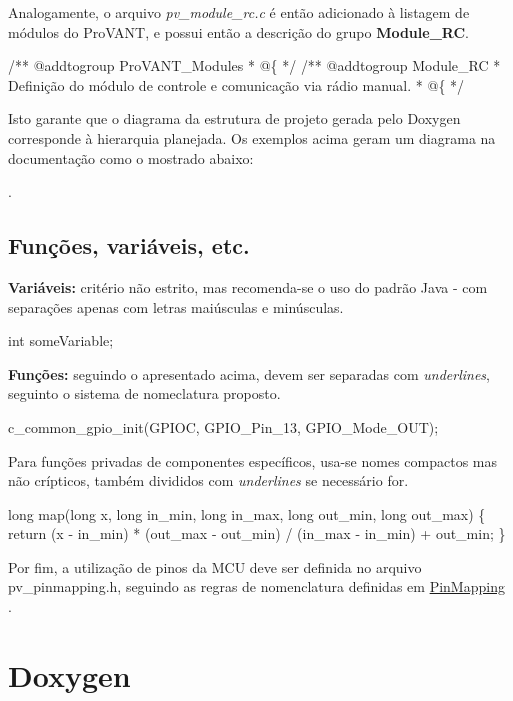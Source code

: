 Analogamente, o arquivo {\itshape pv\-\_\-module\-\_\-rc.\-c} é então adicionado à listagem de módulos do Pro\-V\-A\-N\-T, e possui então a descrição do grupo {\bfseries Module\-\_\-\-R\-C}.


\begin{DoxyCode}
\textcolor{comment}{/** @addtogroup ProVANT\_Modules}
\textcolor{comment}{  * @\{}
\textcolor{comment}{  */}
\textcolor{comment}{}
\textcolor{comment}{/** @addtogroup Module\_RC}
\textcolor{comment}{  * Definição do módulo de controle e comunicação via rádio manual.}
\textcolor{comment}{  * @\{}
\textcolor{comment}{  */}
\end{DoxyCode}


Isto garante que o diagrama da estrutura de projeto gerada pelo Doxygen corresponde à hierarquia planejada. Os exemplos acima geram um diagrama na documentação como o mostrado abaixo\-:

.\hypertarget{page_naming_page_naming_subsec_codenaming}{}\subsection{Funções, variáveis, etc.}\label{page_naming_page_naming_subsec_codenaming}
{\bfseries Variáveis\-:} critério não estrito, mas recomenda-\/se o uso do padrão Java -\/ com separações apenas com letras maiúsculas e minúsculas.


\begin{DoxyCode}
\textcolor{keywordtype}{int} someVariable; 
\end{DoxyCode}


{\bfseries Funções\-:} seguindo o apresentado acima, devem ser separadas com {\itshape underlines}, seguinto o sistema de nomeclatura proposto.


\begin{DoxyCode}
c\_common\_gpio\_init(GPIOC, GPIO\_Pin\_13, GPIO\_Mode\_OUT); 
\end{DoxyCode}
 Para funções privadas de componentes específicos, usa-\/se nomes compactos mas não crípticos, também divididos com {\itshape underlines} se necessário for. 
\begin{DoxyCode}
\textcolor{keywordtype}{long} map(\textcolor{keywordtype}{long} x, \textcolor{keywordtype}{long} in\_min, \textcolor{keywordtype}{long} in\_max, \textcolor{keywordtype}{long} out\_min, \textcolor{keywordtype}{long} out\_max) \{
    \textcolor{keywordflow}{return} (x - in\_min) * (out\_max - out\_min) / (in\_max - in\_min) + out\_min;
\} 
\end{DoxyCode}


Por fim, a utilização de pinos da M\-C\-U deve ser definida no arquivo {\ttfamily pv\-\_\-pinmapping.\-h}, seguindo as regras de nomenclatura definidas em \hyperlink{}{Pin\-Mapping } .\hypertarget{page_naming_page_naming_sec_doxygen}{}\section{Doxygen}\label{page_naming_page_naming_sec_doxygen}
